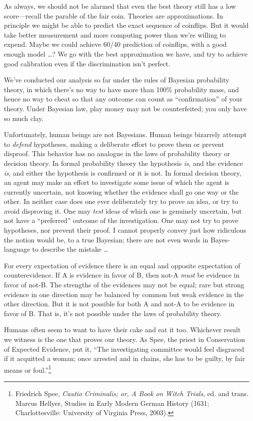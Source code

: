 {
 As always, we should not be alarmed that even the best theory
still has a low score---recall the parable of the fair coin. Theories
are approximations. In principle we might be able to predict the exact
sequence of coinflips. But it would take better measurement and more
computing power than we're willing to expend. Maybe we
could achieve 60/40 prediction of coinflips, with a good enough model
\ldots ? We go with the best approximation we have, and try to achieve
good calibration even if the discrimination isn't
perfect.}

{
 We've conducted our analysis so far under the
rules of Bayesian probability theory, in which there's
no way to have more than 100\% probability mass, and hence no way to
cheat so that any outcome can count as
``confirmation'' of your theory.
Under Bayesian law, play money may not be counterfeited; you only have
so much clay.}

{
 Unfortunately, human beings are not Bayesians. Human beings
bizarrely attempt to \textit{defend} hypotheses, making a deliberate
effort to prove them or prevent disproof. This behavior has no analogue
in the laws of probability theory or decision theory. In formal
probability theory the hypothesis \textit{is}, and the evidence
\textit{is}, and either the hypothesis is confirmed or it is not. In
formal decision theory, an agent may make an effort to investigate some
issue of which the agent is currently uncertain, not knowing whether
the evidence shall go one way or the other. In neither case does one
ever deliberately try to prove an idea, or try to avoid disproving it.
One may \textit{test} ideas of which one is genuinely uncertain, but
not have a ``preferred'' outcome of
the investigation. One may not try to prove hypotheses, nor prevent
their proof. I cannot properly convey just how ridiculous the notion
would be, to a true Bayesian; there are not even words in
Bayes-language to describe the mistake \ldots}

{
 For every expectation of evidence there is an equal and opposite
expectation of counterevidence. If A is evidence in favor of B, then
not-A \textit{must} be evidence in favor of not-B. The strengths of the
evidences may not be equal; rare but strong evidence in one direction
may be balanced by common but weak evidence in the other direction. But
it is not possible for both A and not-A to be evidence in favor of B.
That is, it's not possible under the laws of
probability theory.}

{
 Humans often seem to want to have their cake and eat it too.
Whichever result we witness is the one that proves our theory. As Spee,
the priest in Conservation of Expected Evidence, put it,
``The investigating committee would feel disgraced if
it acquitted a woman; once arrested and in chains, she has to be
guilty, by fair means or foul.''\footnote{Friedrich Spee, \textit{Cautio Criminalis; or, A Book on Witch
Trials}, ed. and trans. Marcus Hellyer, Studies in Early Modern German
History (1631; Charlottesville: University of Virginia Press, 2003).}}

